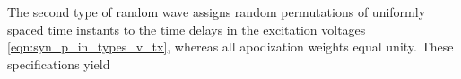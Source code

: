 The second type of
random wave assigns
random permutations of
uniformly spaced time instants to
the time delays in
the excitation voltages
\eqref{eqn:syn_p_in_types_v_tx}, whereas
all apodization weights equal
unity.
These specifications yield
